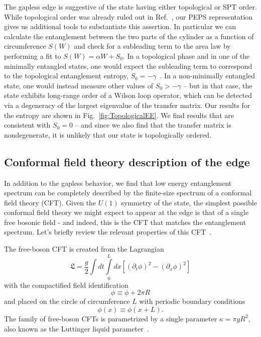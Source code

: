 The gapless edge is suggestive of the state having either topological or SPT order.
While topological order was already ruled out in Ref.~\cite{kimchi2013}, our PEPS
representation gives us additional tools to substantiate this assertion. In particular
we can calculate the entanglement between the two parts of the cylinder as a function
of circumference $S(W)$ and check for a subleading term to the area law by performing
a fit to $S(W) = \alpha W + S_0$. In a topological phase and in one of the minimally entangled
states, one would expect the subleading term to correspond to the topological entanglement
entropy, $S_0 = -\gamma$~\cite{kitaev2006, levin2006, jiang2012}.
In a non-minimally entangled state, one would instead measure other values of $S_0 > -\gamma$
-- but in that case, the state exhibits long-range order of a Wilson loop operator, which can be detected via a degeneracy of
 the largest eigenvalue of the transfer matrix.
Our results for the entropy are shown in Fig.~\ref{fig:TopologicalEE}. We find results that are consistent
with $S_0 = 0$ -- and since we also find that the transfer matrix is nondegenerate,
it is unlikely that our state is topologically ordered.

\subsection{Conformal field theory description of the edge}
\label{sec:CFT}

In addition to the gapless behavior, we find that low energy entanglement spectrum
can be completely described by the finite-size spectrum of a conformal field theory (CFT). 
Given the $U(1)$ symmetry of the state, the simplest possible
conformal field theory we might expect to appear at the edge is that
of a single free bosonic field - and indeed, this is the CFT that matches the 
entanglement spectrum.
Let's briefly review the relevant properties of this CFT~\cite{difrancesco}.

The free-boson CFT is created from the Lagrangian
\begin{equation}
\mathfrak{L} = \frac{g}{2}\int dt \int\limits_0^L dx \left[ (\partial_t \phi)^2 - (\partial_x \phi)^2 \right]
\end{equation}
with the compactified field identification
\begin{equation*}
\phi \equiv \phi + 2\pi R
\end{equation*}
and placed on the circle of circumference $L$ with periodic boundary conditions
\begin{equation*}
\phi(x) \equiv \phi(x+L).
\end{equation*}
The family of free-boson CFTs is parametrized by a single parameter
$\kappa = \pi g R^2$, also known as the Luttinger liquid parameter~\cite{difrancesco, giamarchi}.

